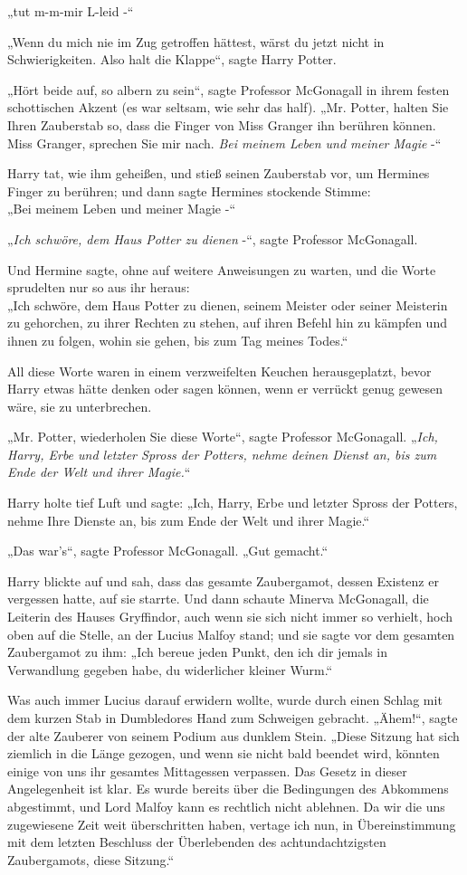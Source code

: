 {„tut m-m-mir L-leid -“

„Wenn du mich nie im Zug getroffen hättest, wärst du jetzt nicht in Schwierigkeiten. Also halt die Klappe“, sagte Harry Potter.

„Hört beide auf, so albern zu sein“, sagte Professor McGonagall in ihrem festen schottischen Akzent (es war seltsam, wie sehr das half). „Mr. Potter, halten Sie Ihren Zauberstab so, dass die Finger von Miss Granger ihn berühren können. Miss Granger, sprechen Sie mir nach. \emph{Bei meinem Leben und meiner Magie} -“

Harry tat, wie ihm geheißen, und stieß seinen Zauberstab vor, um Hermines Finger zu berühren; und dann sagte Hermines stockende Stimme:\\ „Bei meinem Leben und meiner Magie -“

„\emph{Ich schwöre, dem Haus Potter zu dienen} -“, sagte Professor McGonagall.

Und Hermine sagte, ohne auf weitere Anweisungen zu warten, und die Worte sprudelten nur so aus ihr heraus:\\ „Ich schwöre, dem Haus Potter zu dienen, seinem Meister oder seiner Meisterin zu gehorchen, zu ihrer Rechten zu stehen, auf ihren Befehl hin zu kämpfen und ihnen zu folgen, wohin sie gehen, bis zum Tag meines Todes.“

All diese Worte waren in einem verzweifelten Keuchen herausgeplatzt, bevor Harry etwas hätte denken oder sagen können, wenn er verrückt genug gewesen wäre, sie zu unterbrechen.

„Mr. Potter, wiederholen Sie diese Worte“, sagte Professor McGonagall. „\emph{Ich, Harry, Erbe und letzter Spross der Potters, nehme deinen Dienst an, bis zum Ende der Welt und ihrer Magie.}“

Harry holte tief Luft und sagte: „Ich, Harry, Erbe und letzter Spross der Potters, nehme Ihre Dienste an, bis zum Ende der Welt und ihrer Magie.“

„Das war's“, sagte Professor McGonagall. „Gut gemacht.“

Harry blickte auf und sah, dass das gesamte Zaubergamot, dessen Existenz er vergessen hatte, auf sie starrte. Und dann schaute Minerva McGonagall, die Leiterin des Hauses Gryffindor, auch wenn sie sich nicht immer so verhielt, hoch oben auf die Stelle, an der Lucius Malfoy stand; und sie sagte vor dem gesamten Zaubergamot zu ihm: „Ich bereue jeden Punkt, den ich dir jemals in Verwandlung gegeben habe, du widerlicher kleiner Wurm.“

Was auch immer Lucius darauf erwidern wollte, wurde durch einen Schlag mit dem kurzen Stab in Dumbledores Hand zum Schweigen gebracht. „Ähem!“, sagte der alte Zauberer von seinem Podium aus dunklem Stein. „Diese Sitzung hat sich ziemlich in die Länge gezogen, und wenn sie nicht bald beendet wird, könnten einige von uns ihr gesamtes Mittagessen verpassen. Das Gesetz in dieser Angelegenheit ist klar. Es wurde bereits über die Bedingungen des Abkommens abgestimmt, und Lord Malfoy kann es rechtlich nicht ablehnen. Da wir die uns zugewiesene Zeit weit überschritten haben, vertage ich nun, in Übereinstimmung mit dem letzten Beschluss der Überlebenden des achtundachtzigsten Zaubergamots, diese Sitzung.“

}
